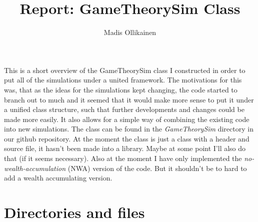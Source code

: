 \documentclass{article}
\author{Madis Ollikainen}
\title{Report: GameTheorySim Class }
\begin{document}
\maketitle


This is a short overview of the GameTheorySim class I constructed in order to put all of the simulations under a united framework. The motivations for this was, that as the ideas for the simulations kept changing, the code started to branch out to much and it seemed that it would make more sense to put it under a unified class structure, such that further developments and changes could be made more easily. It also allows for a simple way of combining the existing code into new simulations. The class can be found in the \emph{GameTheorySim} directory in our github repository. At the moment the class is just a class with a header and source file, it hasn't been made into a library. Maybe at some point I'll also do that (if it seems necessary). Also at the moment I have only implemented the \emph{no-wealth-accumulation} (NWA) version of the code. But it shouldn't be to hard to add a wealth accumulating version.  

\section{Directories and files}
\end{document}
